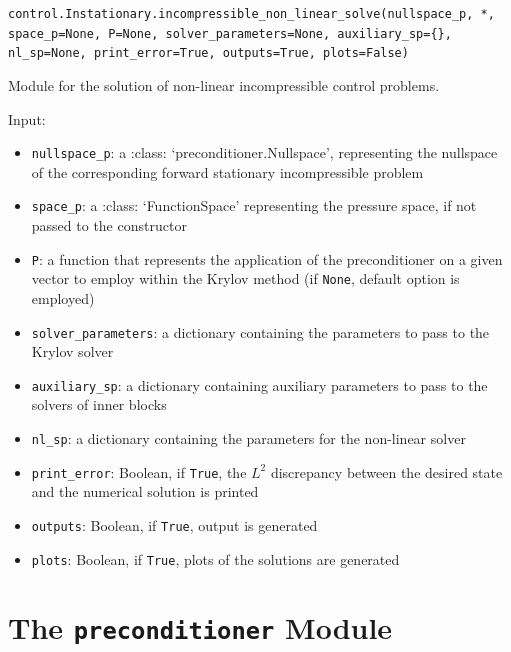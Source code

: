 \documentclass[letterpaper,10pt,english]{sphinxmanual}
\begin{document}
\vspace{3ex}

\texttt{control.Instationary.incompressible{\_}non{\_}linear{\_}solve(nullspace{\_}p, *, space{\_}p=None, P=None, solver{\_}parameters=None, auxiliary{\_}sp=\{\}, nl{\_}sp=None, print{\_}error=True, outputs=True, plots=False)}

Module for the solution of non-linear incompressible control problems.

Input:
\begin{itemize}
\item \texttt{nullspace{\_}p}: a :class: `preconditioner.Nullspace', representing
            the nullspace of the corresponding forward stationary
            incompressible problem

\item \texttt{space{\_}p}: a :class: `FunctionSpace' representing the pressure
            space, if not passed to the constructor

\item \texttt{P}: a function that represents the application of the
            preconditioner on a given vector to employ within the Krylov
            method (if \texttt{None}, default option is employed)

\item \texttt{solver{\_}parameters}: a dictionary containing the parameters to pass
            to the Krylov solver

\item \texttt{auxiliary{\_}sp}: a dictionary containing auxiliary parameters to
            pass to the solvers of inner blocks

\item \texttt{nl{\_}sp}: a dictionary containing the parameters for the non-linear
            solver

\item \texttt{print{\_}error}: Boolean, if \texttt{True}, the $L^2$ discrepancy between the desired state and the numerical solution is printed

\item \texttt{outputs}: Boolean, if \texttt{True}, output is generated

\item \texttt{plots}: Boolean, if \texttt{True}, plots of the solutions are generated
\end{itemize}



\chapter{The \texttt{preconditioner} Module}
\end{document}
